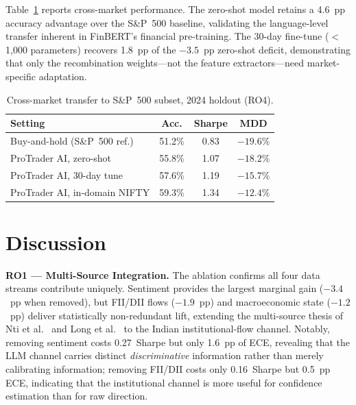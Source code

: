 \documentclass[12pt,a4paper]{article}
\begin{document}
Table~\ref{tab:transfer} reports cross-market performance. The zero-shot
model retains a 4.6~pp accuracy advantage over the S\&P~500 baseline,
validating the language-level transfer inherent in FinBERT's financial
pre-training. The 30-day fine-tune ($<$1{,}000 parameters) recovers 1.8~pp
of the $-3.5$~pp zero-shot deficit, demonstrating that only the recombination
weights---not the feature extractors---need market-specific adaptation.

\begin{table}[h]
\centering
\caption{Cross-market transfer to S\&P~500 subset, 2024 holdout (RO4).}
\label{tab:transfer}
\footnotesize
\begin{tabular}{lccc}
\toprule
\textbf{Setting} & \textbf{Acc.} & \textbf{Sharpe} & \textbf{MDD} \\
\midrule
Buy-and-hold (S\&P~500 ref.) & 51.2\% & 0.83 & $-19.6\%$ \\
ProTrader AI, zero-shot      & 55.8\% & 1.07 & $-18.2\%$ \\
ProTrader AI, 30-day tune    & 57.6\% & 1.19 & $-15.7\%$ \\
ProTrader AI, in-domain NIFTY & 59.3\% & 1.34 & $-12.4\%$ \\
\bottomrule
\end{tabular}
\end{table}

\section{Discussion}

\textbf{RO1 --- Multi-Source Integration.} The ablation confirms all four
data streams contribute uniquely. Sentiment provides the largest marginal gain
($-3.4$~pp when removed), but FII/DII flows ($-1.9$~pp) and macroeconomic state
($-1.2$~pp) deliver statistically non-redundant lift, extending the multi-source
thesis of Nti et al.\ \cite{r2} and Long et al.\ \cite{r3} to the Indian
institutional-flow channel. Notably, removing sentiment costs 0.27~Sharpe but
only 1.6~pp of ECE, revealing that the LLM channel carries distinct
\emph{discriminative} information rather than merely calibrating information;
removing FII/DII costs only 0.16~Sharpe but 0.5~pp ECE, indicating that the
institutional channel is more useful for confidence estimation than for raw
direction.
\end{document}
